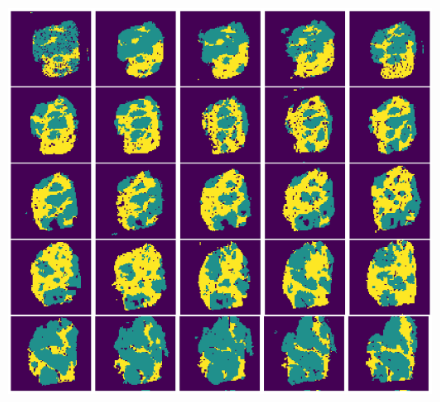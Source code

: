\documentclass{WileyMSP-template}
\begin{document}
\newcommand{\colWidth}{0.19}
\begin{figure}[htbp]
  \centering
    \includegraphics[width=\textwidth]{pic/clusters_all_sections.png}

\end{figure}
\end{document}
